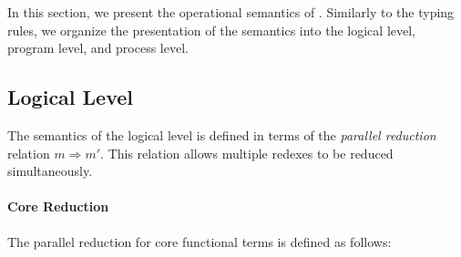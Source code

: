 In this section, we present the operational semantics of \TLLC{}. 
Similarly to the typing rules, we organize the presentation of the semantics
into the logical level, program level, and process level.

\subsection{Logical Level}\label{appendix:logical-semantics}
The semantics of the logical level is defined in terms of the 
\emph{parallel reduction} relation $m \Rightarrow m'$. This relation allows 
multiple redexes to be reduced simultaneously.

\paragraph{\textbf{Core Reduction}}
The parallel reduction for core functional terms is defined as follows:
